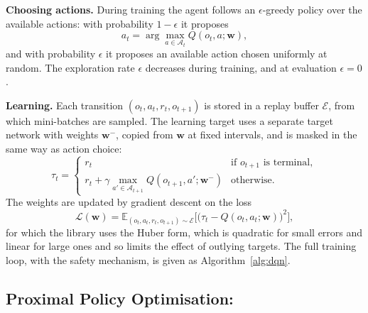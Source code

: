\textbf{Choosing actions.} During training the agent follows an $\epsilon$-greedy policy over the available actions: with probability $1 - \epsilon$ it proposes
\begin{equation}
a_t = \arg\max_{a \in \mathcal{A}_t} Q(o_t, a; \mathbf{w}),
\end{equation}
and with probability $\epsilon$ it proposes an available action chosen uniformly at random. The exploration rate $\epsilon$ decreases during training, and at evaluation $\epsilon = 0$.

\textbf{Learning.} Each transition $(o_t, a_t, r_t, o_{t+1})$ is stored in a replay buffer $\mathcal{E}$, from which mini-batches are sampled. The learning target uses a separate target network with weights $\mathbf{w}^{-}$, copied from $\mathbf{w}$ at fixed intervals, and is masked in the same way as action choice:
\begin{equation}
\tau_t = \begin{cases}
r_t & \text{if } o_{t+1} \text{ is terminal}, \\
r_t + \gamma \max_{a' \in \mathcal{A}_{t+1}} Q(o_{t+1}, a'; \mathbf{w}^{-}) & \text{otherwise}.
\end{cases}
\end{equation}
The weights are updated by gradient descent on the loss
\begin{equation}
\mathcal{L}(\mathbf{w}) = \mathbb{E}_{(o_t, a_t, r_t, o_{t+1}) \sim \mathcal{E}} \Big[ \big( \tau_t - Q(o_t, a_t; \mathbf{w}) \big)^{2} \Big],
\label{eq:dqnloss}
\end{equation}
for which the library uses the Huber form, which is quadratic for small errors and linear for large ones and so limits the effect of outlying targets. The full training loop, with the safety mechanism, is given as Algorithm~\ref{alg:dqn}.

\subsection{Proximal Policy Optimisation:}


